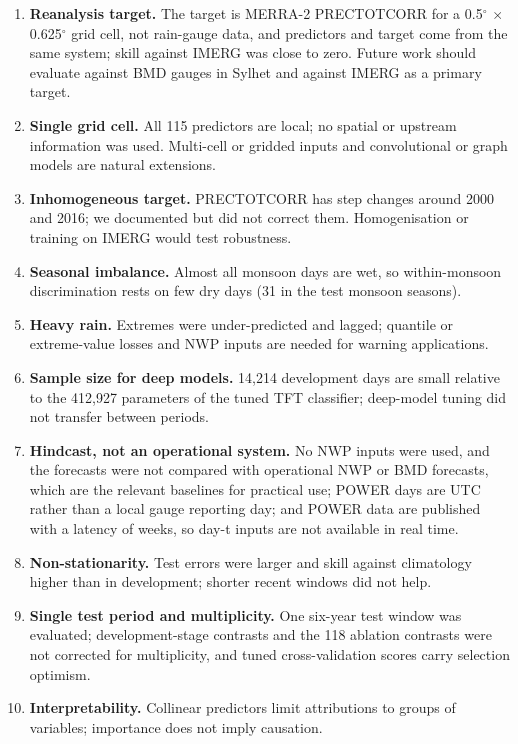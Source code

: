 \documentclass[
]{article}
\providecommand{\tightlist}{%
  \setlength{\itemsep}{0pt}\setlength{\parskip}{0pt}}
\begin{document}
\begin{enumerate}
\def\labelenumi{\arabic{enumi}.}
\tightlist
\item
  \textbf{Reanalysis target.} The target is MERRA-2 PRECTOTCORR for a 0.5$^{\circ}$ $\times$ 0.625$^{\circ}$ grid cell, not rain-gauge data, and predictors and target come from the same system; skill against IMERG was close to zero. Future work should evaluate against BMD gauges in Sylhet and against IMERG as a primary target.  %
\item
  \textbf{Single grid cell.} All 115 predictors are local; no spatial or upstream information was used. Multi-cell or gridded inputs and convolutional or graph models are natural extensions.
\item
  \textbf{Inhomogeneous target.} PRECTOTCORR has step changes around 2000 and 2016; we documented but did not correct them. Homogenisation or training on IMERG would test robustness.
\item
  \textbf{Seasonal imbalance.} Almost all monsoon days are wet, so within-monsoon discrimination rests on few dry days (31 in the test monsoon seasons).
\item
  \textbf{Heavy rain.} Extremes were under-predicted and lagged; quantile or extreme-value losses and NWP inputs are needed for warning applications.
\item
  \textbf{Sample size for deep models.} 14,214 development days are small relative to the 412,927 parameters of the tuned TFT classifier; deep-model tuning did not transfer between periods.  %
\item
  \textbf{Hindcast, not an operational system.} No NWP inputs were used, and the forecasts were not compared with operational NWP or BMD forecasts, which are the relevant baselines for practical use; POWER days are UTC rather than a local gauge reporting day; and POWER data are published with a latency of weeks, so day-t inputs are not available in real time.
\item
  \textbf{Non-stationarity.} Test errors were larger and skill against climatology higher than in development; shorter recent windows did not help.
\item
  \textbf{Single test period and multiplicity.} One six-year test window was evaluated; development-stage contrasts and the 118 ablation contrasts were not corrected for multiplicity, and tuned cross-validation scores carry selection optimism.
\item
  \textbf{Interpretability.} Collinear predictors limit attributions to groups of variables; importance does not imply causation.
\end{enumerate}
\end{document}
